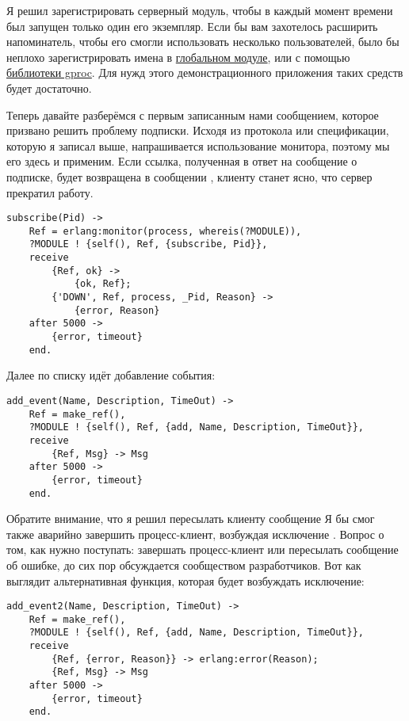 Я решил зарегистрировать серверный модуль, чтобы в каждый момент времени был запущен только один его экземпляр.
Если бы вам захотелось расширить напоминатель, чтобы его смогли использовать несколько пользователей, было бы неплохо зарегистрировать имена в \href{http://erldocs.com/R15B/stdlib/global.html}{глобальном модуле}, или с помощью \href{http://github.com/uwiger/gproc}{библиотеки gproc}.
Для нужд этого демонстрационного приложения таких средств будет достаточно.

Теперь давайте разберёмся с первым записанным нами сообщением, которое призвано решить проблему подписки.
Исходя из протокола или спецификации, которую я записал выше, напрашивается использование монитора, поэтому мы его здесь и применим.
Если ссылка, полученная в ответ на сообщение о подписке, будет возвращена в сообщении , клиенту станет ясно, что сервер прекратил работу.
\begin{lstlisting}[style=erlang]
subscribe(Pid) ->
    Ref = erlang:monitor(process, whereis(?MODULE)),
    ?MODULE ! {self(), Ref, {subscribe, Pid}},
    receive
        {Ref, ok} ->
            {ok, Ref};
        {'DOWN', Ref, process, _Pid, Reason} ->
            {error, Reason}
    after 5000 ->
        {error, timeout}
    end.
\end{lstlisting}

Далее по списку идёт добавление события:
\begin{lstlisting}[style=erlang]
add_event(Name, Description, TimeOut) ->
    Ref = make_ref(),
    ?MODULE ! {self(), Ref, {add, Name, Description, TimeOut}},
    receive
        {Ref, Msg} -> Msg
    after 5000 ->
        {error, timeout}
    end.
\end{lstlisting}

Обратите внимание, что я решил пересылать клиенту сообщение 
Я бы смог также аварийно завершить процесс\--клиент, возбуждая исключение .
Вопрос о том, как нужно поступать: завершать процесс\--клиент или пересылать сообщение об ошибке, до сих пор обсуждается сообществом разработчиков.
Вот как выглядит альтернативная функция, которая будет возбуждать исключение:
\begin{lstlisting}[style=erlang]
add_event2(Name, Description, TimeOut) ->
    Ref = make_ref(),
    ?MODULE ! {self(), Ref, {add, Name, Description, TimeOut}},
    receive
        {Ref, {error, Reason}} -> erlang:error(Reason);
        {Ref, Msg} -> Msg
    after 5000 ->
        {error, timeout}
    end.
\end{lstlisting}

